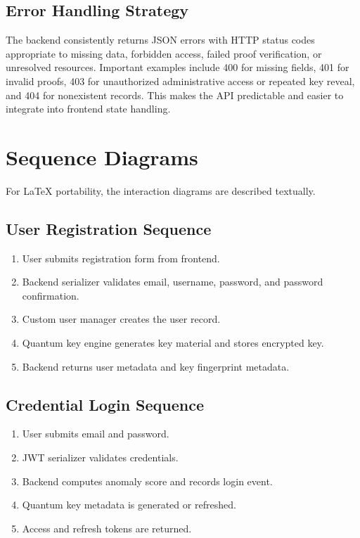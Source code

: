 \subsection{Error Handling Strategy}
The backend consistently returns JSON errors with HTTP status codes appropriate to missing data, forbidden access, failed proof verification, or unresolved resources. Important examples include 400 for missing fields, 401 for invalid proofs, 403 for unauthorized administrative access or repeated key reveal, and 404 for nonexistent records. This makes the API predictable and easier to integrate into frontend state handling.

\section{Sequence Diagrams}
For LaTeX portability, the interaction diagrams are described textually.

\subsection{User Registration Sequence}
\begin{enumerate}
    \item User submits registration form from frontend.
    \item Backend serializer validates email, username, password, and password confirmation.
    \item Custom user manager creates the user record.
    \item Quantum key engine generates key material and stores encrypted key.
    \item Backend returns user metadata and key fingerprint metadata.
\end{enumerate}

\subsection{Credential Login Sequence}
\begin{enumerate}
    \item User submits email and password.
    \item JWT serializer validates credentials.
    \item Backend computes anomaly score and records login event.
    \item Quantum key metadata is generated or refreshed.
    \item Access and refresh tokens are returned.
\end{enumerate}

